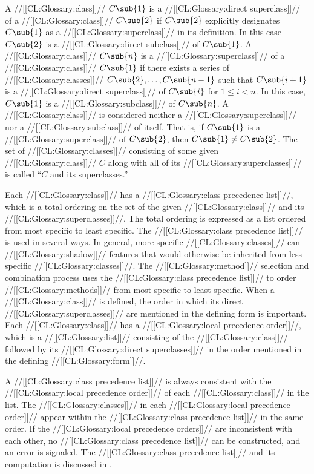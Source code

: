 A //[[CL:Glossary:class]]// $C\sub{1}$ is  a //[[CL:Glossary:direct superclass]]// of a //[[CL:Glossary:class]]// $C\sub{2}$ if $C\sub{2}$ explicitly designates $C\sub{1}$  as a //[[CL:Glossary:superclass]]// in its definition. In this case $C\sub{2}$ is a //[[CL:Glossary:direct subclass]]// of $C\sub{1}$. A //[[CL:Glossary:class]]// $C\sub{n}$ is a //[[CL:Glossary:superclass]]// of  a //[[CL:Glossary:class]]// $C\sub{1}$ if there exists a series of //[[CL:Glossary:classes]]// $C\sub{2},\ldots,C\sub{n-1}$ such that  $C\sub{i+1}$ is a //[[CL:Glossary:direct superclass]]// of $C\sub{i}$ for $1 \leq i<n$. In this case, $C\sub{1}$ is a //[[CL:Glossary:subclass]]// of $C\sub{n}$. A //[[CL:Glossary:class]]// is considered neither a //[[CL:Glossary:superclass]]// nor a //[[CL:Glossary:subclass]]// of itself. That is, if $C\sub{1}$ is a //[[CL:Glossary:superclass]]// of $C\sub{2}$,  then $C\sub{1} \neq C\sub{2}$. The set of //[[CL:Glossary:classes]]// consisting of some given //[[CL:Glossary:class]]// $C$  along with all of its //[[CL:Glossary:superclasses]]// is called ``$C$ and its superclasses.''

Each //[[CL:Glossary:class]]// has a //[[CL:Glossary:class precedence list]]//, which is a total ordering on the set of the given //[[CL:Glossary:class]]// and its //[[CL:Glossary:superclasses]]//. The total ordering is expressed as a list ordered from most specific to least specific. The //[[CL:Glossary:class precedence list]]// is used in several ways.  In general, more specific //[[CL:Glossary:classes]]// can //[[CL:Glossary:shadow]]// features that would otherwise be inherited from less specific //[[CL:Glossary:classes]]//. The //[[CL:Glossary:method]]// selection and combination process uses  the //[[CL:Glossary:class precedence list]]// to order //[[CL:Glossary:methods]]//  from most specific to least specific. 
  When a //[[CL:Glossary:class]]// is defined, the order in which its direct //[[CL:Glossary:superclasses]]// are mentioned in the defining form is important.  Each //[[CL:Glossary:class]]// has a //[[CL:Glossary:local precedence order]]//, which is a //[[CL:Glossary:list]]// consisting of the //[[CL:Glossary:class]]// followed by its //[[CL:Glossary:direct superclasses]]// in the order mentioned in the defining //[[CL:Glossary:form]]//.

A //[[CL:Glossary:class precedence list]]// is always consistent with the //[[CL:Glossary:local precedence order]]// of each //[[CL:Glossary:class]]// in the list.   The //[[CL:Glossary:classes]]// in each //[[CL:Glossary:local precedence order]]// appear within the //[[CL:Glossary:class precedence list]]// in the same order.   If the //[[CL:Glossary:local precedence orders]]// are inconsistent with each other,  no //[[CL:Glossary:class precedence list]]// can be constructed, and an error is signaled. The //[[CL:Glossary:class precedence list]]// and its computation is discussed in \secref\DeterminingtheCPL.

